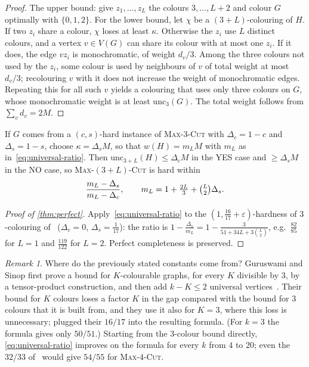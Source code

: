 \documentclass[11pt,letterpaper]{article}
\theoremstyle{remark}
\newtheorem{remark}[theorem]{Remark}
\newcommand{\MC}[1]{\textup{\textsc{Max-$#1$-Cut}}}
\newcommand{\eps}{\varepsilon}
\begin{document}
\begin{proof}
The upper bound: give $z_1,\dots,z_L$ the colours $3,\dots,L+2$ and colour $G$ optimally with
$\{0,1,2\}$. For the lower bound, let $\chi$ be a $(3+L)$-colouring of $H$. If two $z_i$ share a colour,
$\chi$ loses at least $\kappa$. Otherwise the $z_i$ use $L$ distinct colours, and a vertex $v\in V(G)$ can
share its colour with at most one $z_i$. If it does, the edge $vz_i$ is monochromatic, of weight
$d_v/3$. Among the three colours not used by the $z_i$, some colour is used by neighbours of $v$ of total
weight at most $d_v/3$; recolouring $v$ with it does not increase the weight of monochromatic edges.
Repeating this for all such $v$ yields a colouring that uses only three colours on $G$, whose
monochromatic weight is at least $\mathrm{unc}_3(G)$. The total weight follows from $\sum_vd_v=2M$.
\end{proof}

If $G$ comes from a $(c,s)$-hard instance of \MC{3} with $\Delta_c=1-c$ and $\Delta_s=1-s$, choose
$\kappa=\Delta_sM$, so that $w(H)=m_LM$ with $m_L$ as in~\eqref{eq:universal-ratio}. Then
$\mathrm{unc}_{3+L}(H)\le\Delta_cM$ in the YES case and $\ge\Delta_sM$ in the NO case, so \MC{(3+L)} is
hard within
\begin{equation}\label{eq:universal-ratio}
  \frac{m_L-\Delta_s}{m_L-\Delta_c},\qquad m_L = 1+\tfrac{2L}{3}+\tbinom L2\Delta_s .
\end{equation}

\begin{proof}[Proof of \cref{thm:perfect}]
Apply~\eqref{eq:universal-ratio} to the $(1,\frac{16}{17}+\eps)$-hardness of $3$-colouring
of~\cite{AOTW14} ($\Delta_c=0$, $\Delta_s=\frac1{17}$): the ratio is
$1-\frac{\Delta_s}{m_L}=1-\frac{3}{51+34L+3\binom L2}$, e.g.\ $\frac{82}{85}$ for $L=1$ and $\frac{119}{122}$
for $L=2$. Perfect completeness is preserved.
\end{proof}

\begin{remark}
Where do the previously stated constants come from? Guruswami and Sinop first prove a bound for
$K$-colourable graphs, for every $K$ divisible by $3$, by a tensor-product construction, and then add
$k-K\le2$ universal vertices~\cite[Sec.~2.3]{GS13}. Their bound for $K$ colours loses a factor $K$ in the
gap compared with the bound for $3$ colours that it is built from, and they use it also for $K=3$, where
this loss is unnecessary; \cite{AOTW14} plugged their $16/17$ into the resulting formula. (For $k=3$ the
formula gives only $50/51$.) Starting from the $3$-colour bound directly, \eqref{eq:universal-ratio}
improves on the formula for every $k$ from $4$ to $20$; even the $32/33$ of~\cite{GS13} would give
$54/55$ for \MC{4}.
\end{remark}
\end{document}
